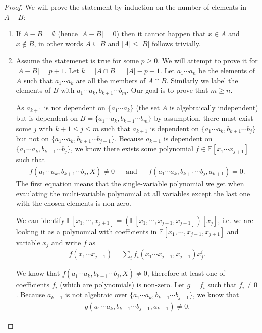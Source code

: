 \begin{proof}
	We will prove the statement by induction on the number of elements in $A - B$:
	\begin{enumerate}
		\item  If $A - B = \emptyset $ (hence $|A -B| = 0$) then it cannot happen that $x\in A$ and $x\notin B$, in other words $A \subseteq B$ and $|A| \leq |B|$ follows trivially.
		\item  Assume the statemenet is true for some $p\geq 0 $. We will attempt to prove it for $|A - B| = p + 1$. Let $k = |A \cap B| = |A| - p - 1$. Let $a _1 \cdots a _n$ be the elements of $A$ such that $a _1 \cdots a_k$ are all the members of $A \cap B$. Similarly we label the elements of $B$ with $ a _1 \cdots a_k, b _{k + 1} \cdots b _m$. Our goal is to prove that $m \geq n$.

		      As $a _{k + 1}$ is not dependent on $\{a _1 \cdots a_k\}$ (the set $A$ is algebraically independent) but is dependent on $B = \{a _1 \cdots a _k, b _{k + 1} \cdots b_m\}$ by assumption, there must exist some $j$ with $k + 1 \leq j \leq m$ such that $a _{k + 1}$ is dependent on $\{a _1 \cdots a _k, b _{k + 1} \cdots b_j\}$ but  not on $\{a _1 \cdots a _k, b _{k + 1} \cdots b _{j - 1}\}$. Because $a _{k + 1}$ is dependent on $\{a _1 \cdots a _k, b _{k + 1} \cdots b_j\}$, we know there exists some polynomial $f \in \mathbb F[x _1 \cdots x _{j + 1}]$ such that
		      \begin{align*}
			      f(a _1 \cdots a _{k}, b _{k + 1} \cdots b _{j}, X) \neq  0 &&\text{and}&&
			      f(a _1 \cdots a _{k}, b _{k + 1} \cdots b _{j}, a _{k + 1})  = 0.
		      \end{align*}
        The first equation means that the single-variable polynomial we get when evaulating the multi-variable polynomial at all variables except the last one with the chosen elements is non-zero. 

		      We can identify $\mathbb{F}[x_1,\cdots,x_{j+1}] = (\mathbb{F}[x_1,\cdots, x_{j-1}, x_{j+1}])[x_j]$, i.e. we are looking it as a polynomial with coefficients in  $\mathbb{F}[x_1,\cdots, x_{j-1}, x_{j+1}]$ and variable $x_j$ and write $f$ as
		      \begin{align*}
			      f(x _1 \cdots x _{j + 1})
			      = \sum_i f _i(x _1 \cdots x _{j - 1}, x _{j + 1}) x _j ^i.
		      \end{align*}

		      We know that $f(a _1 \cdots a _{k}, b _{k + 1} \cdots b _{j}, X) \neq  0$, therefore at least one of coefficients $f _i $ (which are polynomials) is non-zero. Let $g = f _i $ such that $f _i \neq 0$. Because $a _{k + 1}$ is not algebraic over $\{a _1 \cdots a _k, b _{k + 1} \cdots b _{j - 1}\}$, we know that
		      \begin{align*}
			      g(a _1 \cdots a _k, b _{k + 1} \cdots b _{j - 1}, a _{k + 1}) \neq 0.
		      \end{align*}


\end{enumerate}
\end{proof}

